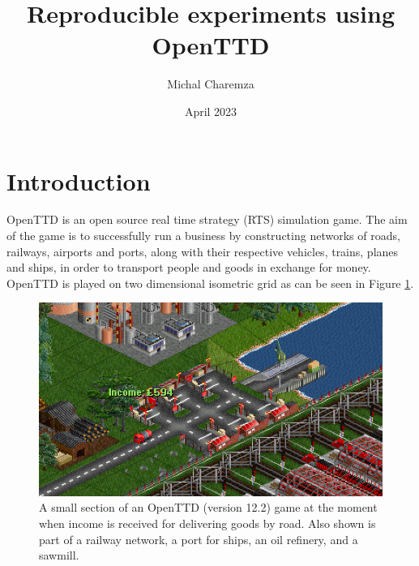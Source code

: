 \documentclass[twocolumn]{article}
\title{Reproducible experiments using OpenTTD}
\author{Michal Charemza}
\date{April 2023}
\begin{document}

\section{Introduction}

OpenTTD \cite{openttd} is an open source real time strategy (RTS) simulation game. The aim of the game is to successfully run a business by constructing networks of roads, railways, airports and ports, along with their respective vehicles, trains, planes and ships, in order to transport people and goods in exchange for money. OpenTTD is played on two dimensional isometric grid as can be seen in Figure \ref{fig:openttd}.

\begin{figure}[h]
\centering
\includegraphics[width=\columnwidth]{assets/openttd-screenshot.png}
\caption{A small section of an OpenTTD (version 12.2) game at the moment when income is received for delivering goods by road. Also shown is part of a railway network, a port for ships, an oil refinery, and a sawmill.}
\label{fig:openttd}
\end{figure}
\end{document}
